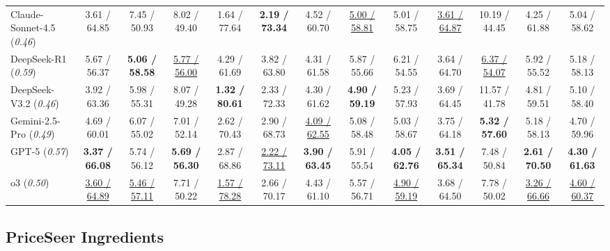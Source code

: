 \documentclass[conference]{IEEEtran}
\begin{document}
\begin{table}[t]
{\begin{tabular}{l|cccccccccccc}
    \midrule
    Claude-Sonnet-4.5 ({\it 0.46}) & 3.61 / 64.85 & 7.45 / 50.93 & 8.02 / 49.40 & 1.64 / 77.64 & \textbf{2.19 / 73.34} & 4.52 / 60.70 & \underline{5.00 / 58.81} & 5.01 / 58.75 & \underline{3.61 / 64.87} & 10.19 / 44.45 & 4.25 / 61.88 & 5.04 / 58.62 \\
    DeepSeek-R1 ({\it 0.59}) & 5.67 / 56.37 & \textbf{5.06 / 58.58} & \underline {5.77 / 56.00} & 4.29 / 61.69 & 3.82 / 63.80 & 4.31 / 61.58 & 5.87 / 55.66 & 6.21 / 54.55 & 3.64 / 64.70 &  \underline {6.37 / 54.07} & 5.92 / 55.52 & 5.18 / 58.13  \\
    DeepSeek-V3.2 ({\it 0.46}) & 3.92 / 63.36 & 5.98 / 55.31 & 8.07 / 49.28 & \textbf{1.32 / 80.61} & 2.33 / 72.33 & 4.30 / 61.62 & \textbf{4.90 / 59.19} & 5.23 / 57.93 & 3.69 / 64.45 & 11.57 / 41.78 & 4.81 / 59.51 & 5.10 / 58.40 \\
    Gemini-2.5-Pro ({\it 0.49}) & 4.69 / 60.01 & 6.07 / 55.02 & 7.01 / 52.14 & 2.62 / 70.43 & 2.90 / 68.73 & \underline {4.09 / 62.55} & 5.08 / 58.48 & 5.03 / 58.67 & 3.75 / 64.18 & \textbf{5.32 / 57.60} & 5.18 / 58.13 & 4.70 / 59.96 \\
    GPT-5 ({\it 0.57})& \textbf{3.37 / 66.08} & 5.74 / 56.12 & \textbf{5.69 / 56.30} & 2.87 / 68.86 & \underline {2.22 / 73.11} & \textbf{3.90 / 63.45} & 5.91 / 55.54 & \textbf{4.05 / 62.76} & \textbf{3.51 / 65.34} & 7.48 / 50.84 & \textbf{2.61 / 70.50} & \textbf{4.30 / 61.63}\\
    o3  ({\it 0.50}) & \underline{3.60 / 64.89} & \underline {5.46 / 57.11} & 7.71 / 50.22 & \underline {1.57 / 78.28} & 2.66 / 70.17 & 4.43 / 61.10 & 5.57 / 56.71 & \underline {4.90 / 59.19} & 3.68 / 64.50 & 7.78 / 50.02 & \underline {3.26 / 66.66} & \underline {4.60 / 60.37} \\
    \bottomrule
    \end{tabular}}
    \label{tab:main_table}
\end{table}



\subsection{PriceSeer Ingredients}
\end{document}
